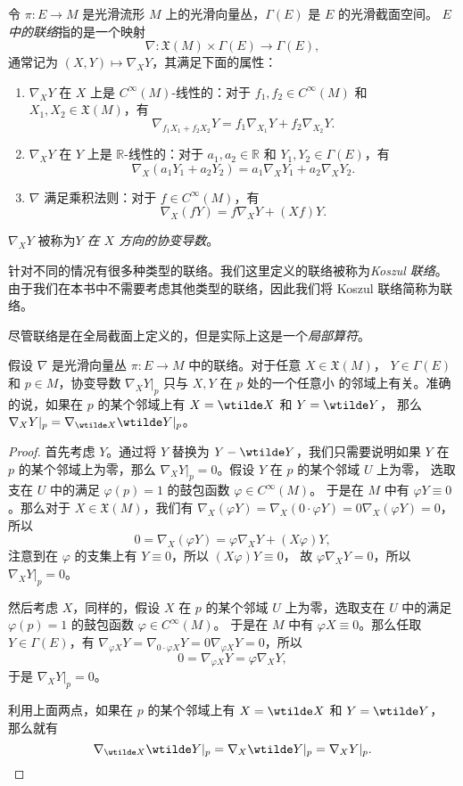 \documentclass[fontset=none]{Notes}
\begin{document}
令 $\pi:E\to M$ 是光滑流形 $M$ 上的光滑向量丛，$\Gamma(E)$ 是 $E$ 的光滑截面空间。
\emph{$E$ 中的联络}指的是一个映射
\[
  \nabla:\mathfrak{X}(M)\times \Gamma(E)\to\Gamma(E),  
\]
通常记为 $(X,Y)\mapsto \nabla_XY$，其满足下面的属性：
\begin{enumerate}
  \item $\nabla_XY$ 在 $X$ 上是 $C^\infty(M)$-线性的：对于
  $f_1,f_2\in C^\infty(M)$ 和 $X_1,X_2\in \mathfrak{X}(M)$，有
  \[
    \nabla_{f_1X_1+f_2X_2}Y=f_1\nabla_{X_1}Y+f_2\nabla_{X_2}Y.  
  \]
  \item $\nabla_XY$ 在 $Y$ 上是 $\mathbb{R}$-线性的：对于
  $a_1,a_2\in \mathbb{R}$ 和 $Y_1,Y_2\in\Gamma(E)$，有
  \[
    \nabla_X(a_1Y_1+a_2Y_2)=a_1\nabla_XY_1+a_2\nabla_XY_2.  
  \]
  \item $\nabla$ 满足乘积法则：对于 $f\in C^\infty(M)$，有
  \[
    \nabla_X(fY)=f\nabla_XY+(Xf)Y.  
  \]
\end{enumerate}
$\nabla_XY$ 被称为\emph{$Y$ 在 $X$ 方向的协变导数}。

针对不同的情况有很多种类型的联络。我们这里定义的联络被称为\emph{Koszul 联络}。
由于我们在本书中不需要考虑其他类型的联络，因此我们将 Koszul 联络简称为联络。

尽管联络是在全局截面上定义的，但是实际上这是一个\emph{局部算符}。

\begin{lemma}[局部性]\label{lemma:locality of connection}
  假设 $\nabla$ 是光滑向量丛 $\pi:E\to M$ 中的联络。对于任意 $X\in \mathfrak{X}(M)$，
  $Y\in \Gamma(E)$ 和 $p\in M$，协变导数 $\nabla_XY|_p$ 只与 $X,Y$ 在 $p$ 处的一个任意小
  的邻域上有关。准确的说，如果在 $p$ 的某个邻域上有 $X=\wtilde X$ 和 $Y=\wtilde Y$，
  那么 $\nabla_XY|_p=\nabla_{\wtilde X}\wtilde Y|_p$。
\end{lemma}
\begin{proof}
  首先考虑 $Y$。通过将 $Y$ 替换为 $Y-\wtilde Y$，我们只需要说明如果 $Y$ 在 $p$
  的某个邻域上为零，那么 $\nabla_XY|_p=0$。假设 $Y$ 在 $p$ 的某个邻域 $U$ 上为零，
  选取支在 $U$ 中的满足 $\varphi(p)=1$ 的鼓包函数 $\varphi\in C^\infty(M)$。
  于是在 $M$ 中有 $\varphi Y\equiv 0$。那么对于 $X\in \mathfrak{X}(M)$，我们有
  $\nabla_X(\varphi Y)=\nabla_X(0\cdot \varphi Y)=0\nabla_X(\varphi Y)=0$，
  所以
  \[
    0=\nabla_X(\varphi Y)=\varphi\nabla_XY+(X\varphi)Y,  
  \]
  注意到在 $\varphi$ 的支集上有 $Y\equiv 0$，所以 $(X\varphi)Y\equiv 0$，
  故 $\varphi\nabla_XY=0$，所以 $\nabla_XY|_p=0$。

  然后考虑 $X$，同样的，假设 $X$ 在 $p$ 的某个邻域 $U$ 上为零，选取支在 $U$ 中的满足 $\varphi(p)=1$ 的鼓包函数 $\varphi\in C^\infty(M)$。
  于是在 $M$ 中有 $\varphi X\equiv 0$。那么任取 $Y\in\Gamma(E)$，有
  $\nabla_{\varphi X}Y=\nabla_{0\cdot\varphi X}Y=0\nabla_{\varphi X}Y=0$，所以
  \[
    0=\nabla_{\varphi X}Y=\varphi\nabla_XY,  
  \]
  于是 $\nabla_XY|_p=0$。

  利用上面两点，如果在 $p$ 的某个邻域上有 $X=\wtilde X$ 和 $Y=\wtilde Y$，
  那么就有
  \[
    \nabla_{\wtilde X}\wtilde Y|_p
    =  \nabla_{X}\wtilde Y|_p=
    \nabla_XY|_p.\qedhere
  \]
\end{proof}
 
\end{document}

